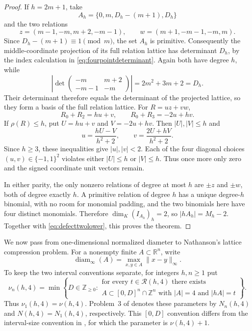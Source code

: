 \documentclass[11pt,reqno]{amsart}
\theoremstyle{definition}
\theoremstyle{remark}
\newcommand{\Z}{\mathbb Z}
\newcommand{\Rcal}{\mathcal R}
\begin{document}
\begin{proof}
If $h=2m+1$, take
\[
 A_h=\{0,m,D_h-(m+1),D_h\}
\]
and the two relations
\[
 z=(m-1,-m,m+2,-m-1),\qquad
 w=(m+1,-m-1,-m,m).
\]
Since $D_h-(m+1)\equiv1\pmod m$, the set $A_h$ is primitive.  Consequently
the middle-coordinate projection of its full relation lattice has determinant
$D_h$, by the index calculation in \eqref{eq:fourpointdeterminant}.
Again both have degree $h$, while
\[
 \left|\det
 \begin{pmatrix}
  -m&m+2\\
  -m-1&-m
 \end{pmatrix}\right|=2m^2+3m+2=D_h.
\]
Their determinant therefore equals the determinant of the projected lattice,
so they form a basis of the full relation lattice.  For $R=uz+vw$,
\[
 R_0+R_2=hu+v,\qquad R_0+R_3=-2u+hv.
\]
If $\rho(R)\leq h$, put $U=hu+v$ and $V=-2u+hv$.
Then $|U|,|V|\leq h$ and
\[
 u=\frac{hU-V}{h^2+2},\qquad
 v=\frac{2U+hV}{h^2+2}.
\]
Since $h\geq3$, these inequalities give $|u|,|v|<2$.  Each of the four
diagonal choices $(u,v)\in\{-1,1\}^2$ violates either $|U|\leq h$ or
$|V|\leq h$.  Thus once more only zero and the signed coordinate unit
vectors remain.

In either parity, the only nonzero relations of degree at most $h$ are
$\pm z$ and $\pm w$, both of degree exactly $h$.  A primitive relation of
degree $h$ has a unique degree-$h$ binomial, with no room for monomial
padding, and the two binomials here have four distinct monomials.  Therefore
$\dim_K(I_{A_h})_h=2$, so $|hA_h|=M_h-2$.  Together with
\eqref{eq:defecttwolower}, this proves the theorem.
\end{proof}

We now pass from one-dimensional normalized diameter to Nathanson's lattice
compression problem.  For a nonempty finite $A\subset\mathbb R^n$, write
\[
 \operatorname{diam}_\infty(A)
 =\max_{x,y\in A}\lVert x-y\rVert_\infty.
\]
To keep the two interval conventions separate, for integers $h,n\geq1$ put
\[
 \nu_n(h,4)=\min\left\{D\in\Z_{\geq0}:
 \substack{\text{for every }t\in\Rcal(h,4)\text{ there exists}\\
 A\subset[0,D]^n\cap\Z^n\text{ with }|A|=4\text{ and }|hA|=t}
 \right\}.
\]
Thus $\nu_1(h,4)=\nu(h,4)$.  Problem~3 of
\cite{NathansonLattice2026} denotes these parameters by $N_n(h,4)$ and
$N(h,4)=N_1(h,4)$, respectively.  This $[0,D]$ convention differs from the
interval-size convention in \cite{NathansonCompression}, for which the
parameter is $\nu(h,4)+1$.
\end{document}

